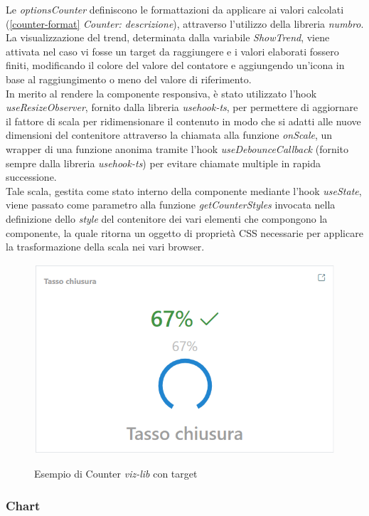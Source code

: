 Le \textit{optionsCounter} definiscono le formattazioni da applicare ai valori calcolati (\ref{counter-format} \textit{Counter: descrizione}), attraverso l'utilizzo della libreria \textit{numbro}. \\
La visualizzazione del trend, determinata dalla variabile \textit{ShowTrend}, viene attivata nel caso vi fosse un target da raggiungere e i valori elaborati
fossero finiti, modificando il colore del valore del contatore e aggiungendo un'icona in base al raggiungimento o meno del valore di riferimento. \\
In merito al rendere la componente responsiva, è stato utilizzato l'hook \textit{useResizeObserver}, fornito dalla libreria \textit{usehook-ts}, per permettere di
aggiornare il fattore di scala per ridimensionare il contenuto in modo che si adatti alle nuove dimensioni del contenitore attraverso la chiamata alla funzione \textit{onScale},
un wrapper di una funzione anonima tramite l'hook \textit{useDebounceCallback} (fornito sempre dalla libreria \textit{usehook-ts}) per evitare chiamate multiple in rapida successione. \\
Tale scala, gestita come stato interno della componente mediante l'hook \textit{useState}, viene passato come parametro alla funzione \textit{getCounterStyles} invocata nella definizione
dello \textit{style} del contenitore dei vari elementi che compongono la componente, la quale ritorna un oggetto di proprietà CSS necessarie per applicare la trasformazione della scala nei
vari browser.

\begin{figure}[H]
    \centering
    \includegraphics[alt={Esempio di Counter viz-lib con target}, width=0.5 \columnwidth, height=\maxdimen, keepaspectratio]{img/ex_counter.png}
    \caption{Esempio di Counter \textit{viz-lib} con target}
    \label{fig:counter-example}
\end{figure}

\subsubsection{Chart}

